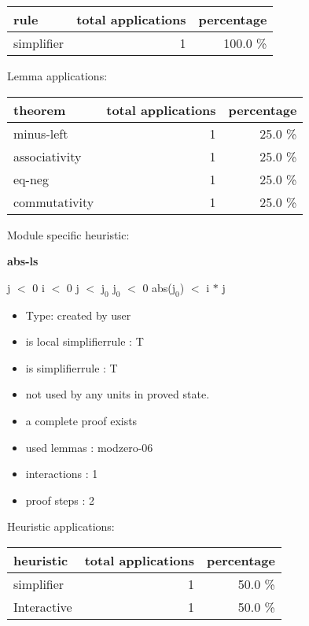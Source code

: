 \documentclass[a4paper]{article}
\begin{document}
\begin{supertabular}{l|r|r}
rule	        & total applications & percentage \\ \hline
simplifier & 1 & 100.0 \% \\

\end{supertabular}

Lemma applications:

\begin{supertabular}{l|r|r}
theorem	        & total applications & percentage \\ \hline
minus-left & 1 & 25.0 \% \\
associativity & 1 & 25.0 \% \\
eq-neg & 1 & 25.0 \% \\
commutativity & 1 & 25.0 \% \\

\end{supertabular}

Module specific heuristic:

\pagebreak

{\LARGE\bf abs-ls}\label{lemma-abs-ls}

\medskip

 \Fol j $<$ 0 \And i $<$ 0 \And j $<$ $\mbox{j}_{0}$ \And $\mbox{j}_{0}$ $<$ 0 \Imp abs($\mbox{j}_{0}$) $<$ i $*$ j

\begin{itemize}

\item Type: created by user

\item is local simplifierrule : T
\item is simplifierrule : T
\item not used by any units in proved state.
\item       a complete proof exists
\item       used lemmas  : modzero-06
\item       interactions : 1
\item       proof steps  : 2
\end{itemize}

\medskip


Heuristic applications:

\begin{supertabular}{l|r|r}
heuristic	& total applications & percentage \\ \hline
simplifier & 1 & 50.0 \% \\
Interactive & 1 & 50.0 \% \\

\end{supertabular}
\end{document}
